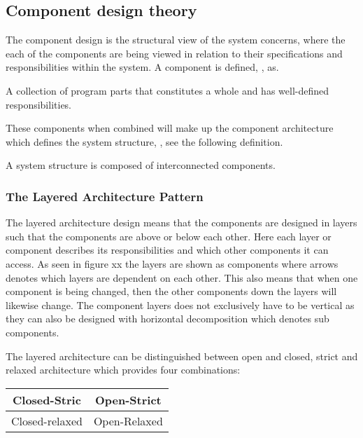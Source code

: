 \subsection{Component design theory} \label{archicomponents}
The component design \cite{Rod-Aalborg} is the structural view of the system concerns, where the each of the components are being viewed in relation to their specifications and responsibilities within the system.
A component is defined, \citep[p.~192]{Rod-Aalborg}, as.
\begin{defn}\label{defn:component}
	A collection of program parts that constitutes a whole and has well-defined responsibilities. 
\end{defn}

These components when combined will make up the component architecture which defines the system structure, \citep[p.~192]{Rod-Aalborg}, see the following definition. 
\begin{defn}\label{defn:Structure}
	A system structure is composed of interconnected components. 
\end{defn}

\subsubsection*{The Layered Architecture Pattern}

The layered architecture design means that the components are designed in layers such that the components are above or below each other.
Here each layer or component describes its responsibilities and which other components it can access.
As seen in {\color{red}figure xx} the layers are shown as components where arrows denotes which layers are dependent on each other.
This also means that when one component is being changed, then the other components down the layers will likewise change.
The component layers does not exclusively have to be vertical as they can also be designed with horizontal decomposition which denotes sub components.

The layered architecture can be distinguished between open and closed, strict and relaxed architecture which provides four combinations:

\begin{center}
	\begin{tabular}{| c | c |}
		\hline
		Closed-Stric & Open-Strict \\
		\hline
		Closed-relaxed & Open-Relaxed \\
		\hline
	\end{tabular}
\end{center}


